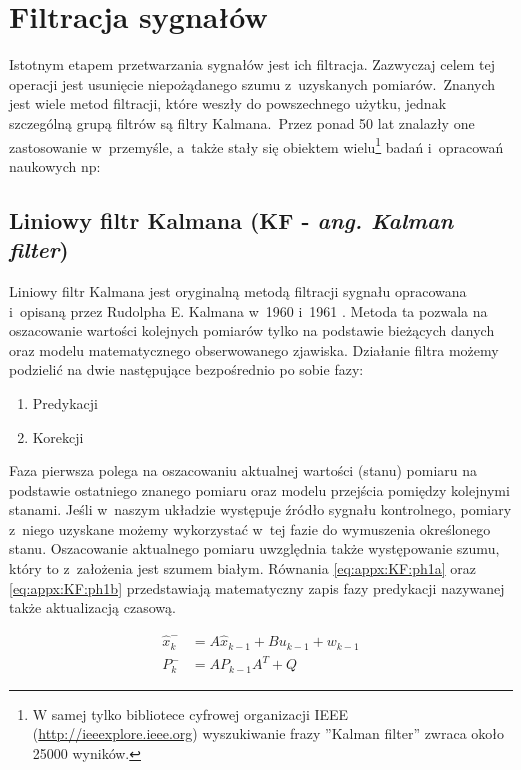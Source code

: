 \chapter{Filtracja sygnałów}
\label{chap:appx:filters}
Istotnym etapem przetwarzania sygnałów jest ich filtracja. Zazwyczaj celem tej operacji jest usunięcie niepożądanego szumu z~uzyskanych pomiarów.~Znanych jest wiele metod filtracji, które weszły do powszechnego użytku, jednak szczególną grupą filtrów są filtry Kalmana.~Przez ponad 50 lat znalazły one zastosowanie w~przemyśle, a~także stały się obiektem wielu\footnote{W samej tylko bibliotece cyfrowej organizacji IEEE (\url{http://ieeexplore.ieee.org}) wyszukiwanie frazy ''Kalman filter'' zwraca około 25000 wyników.} badań i~opracowań naukowych np:  \cite{Droleta,Welch2006, Kedzierski2007, Huo2014, Pandey2014}

\section*{Liniowy filtr Kalmana (KF - \emph{ang. Kalman filter})}
\label{sec:appx:filters:KF}
Liniowy filtr Kalmana jest oryginalną metodą filtracji sygnału opracowana i~opisaną przez Rudolpha E. Kalmana w~1960 \cite{Kalman1960} i~1961 \cite{KalmanBucy1961}. Metoda ta pozwala na oszacowanie wartości kolejnych pomiarów tylko na podstawie bieżących danych oraz modelu matematycznego obserwowanego zjawiska. Działanie filtra możemy podzielić na dwie następujące bezpośrednio po sobie fazy: 
\begin{enumerate}
	\item Predykacji
	\item Korekcji
\end{enumerate}

Faza pierwsza polega na oszacowaniu aktualnej wartości (stanu) pomiaru na podstawie ostatniego znanego pomiaru oraz modelu przejścia pomiędzy kolejnymi stanami. Jeśli w~naszym układzie występuje źródło sygnału kontrolnego, pomiary z~niego uzyskane możemy wykorzystać w~tej fazie do wymuszenia określonego stanu. Oszacowanie aktualnego pomiaru uwzględnia także występowanie szumu, który to z~założenia jest szumem białym. Równania \eqref{eq:appx:KF:ph1a} oraz \eqref{eq:appx:KF:ph1b} przedstawiają matematyczny zapis fazy predykacji nazywanej także aktualizacją czasową.

\begin{subequations}
	\begin{align}
	\widehat{x}^-_k & = A\widehat{x}_{k-1} + Bu_{k-1} + w_{k-1}\label{eq:appx:KF:ph1a} \\
	P^-_k           & = AP_{k-1}A^T + Q \label{eq:appx:KF:ph1b}                        
	\end{align}
\end{subequations}

